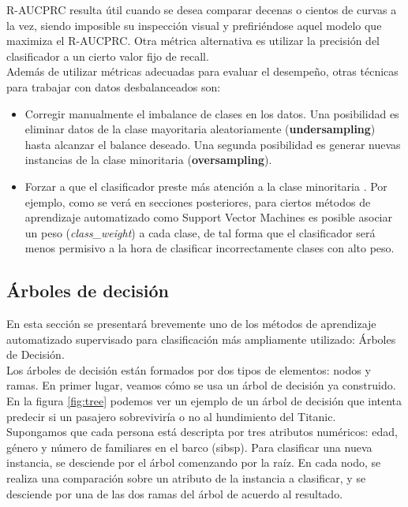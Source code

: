 R-AUCPRC resulta útil cuando se desea comparar decenas o cientos de curvas a la vez, siendo imposible su inspección visual y prefiriéndose aquel modelo que maximiza el R-AUCPRC. Otra métrica alternativa es utilizar la precisión del clasificador a un cierto valor fijo de recall. \\

Además de utilizar métricas adecuadas para evaluar el desempeño, otras técnicas para trabajar con datos desbalanceados son:

\begin{itemize}
\item Corregir manualmente el imbalance de clases en los datos. Una posibilidad es eliminar datos de la clase mayoritaria aleatoriamente (\textbf{undersampling}) \cite{nathalie} hasta alcanzar el balance deseado. Una segunda posibilidad es generar nuevas instancias de la clase minoritaria (\textbf{oversampling}). \cite{he}
\item Forzar a que el clasificador preste más atención a la clase minoritaria \cite{imbalanced_svm}. Por ejemplo, como se verá en secciones posteriores, para ciertos métodos de aprendizaje automatizado como Support Vector Machines es posible asociar un peso (\textit{class\_weight}) a cada clase, de tal forma que el clasificador será menos permisivo a la hora de clasificar incorrectamente clases con alto peso.
\end{itemize}

\subsection{Árboles de decisión}
En esta sección se presentará brevemente uno de los métodos de aprendizaje automatizado supervisado para clasificación más ampliamente utilizado: Árboles de Decisión\cite{mitchell}. \\

Los árboles de decisión están formados por dos tipos de elementos: nodos y ramas. En primer lugar, veamos cómo se usa un árbol de decisión ya construido. En la figura \ref{fig:tree} podemos ver un ejemplo de un árbol de decisión que intenta predecir si un pasajero sobreviviría o no al hundimiento del Titanic.  \\

Supongamos que cada persona está descripta por tres atributos numéricos: edad, género y número de familiares en el barco (sibsp). Para clasificar una nueva instancia, se desciende por el árbol comenzando por la raíz. En cada nodo, se realiza una comparación sobre un atributo de la instancia a clasificar, y se desciende por una de las dos ramas del árbol de acuerdo al resultado. \\

